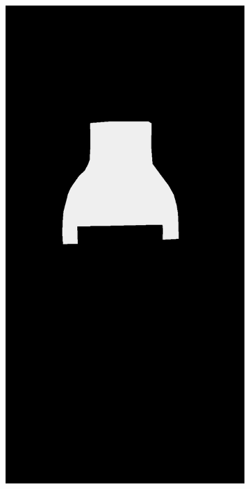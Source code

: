 \begin{figure}[H]
\begin{subfigure}[b]{\textwidth}
\begin{minipage}{0.45\textwidth}
            \includegraphics[width=\textwidth]{figures/appendix/appendix_DRAEM/JB/280_m.png}

\end{minipage}
\end{subfigure}
\end{figure}
